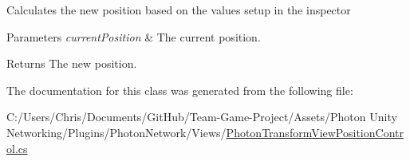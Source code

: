 Calculates the new position based on the values setup in the inspector 


\begin{DoxyParams}{Parameters}
{\em current\+Position} & The current position.\\
\hline
\end{DoxyParams}
\begin{DoxyReturn}{Returns}
The new position.
\end{DoxyReturn}


The documentation for this class was generated from the following file\+:\begin{DoxyCompactItemize}
\item 
C\+:/\+Users/\+Chris/\+Documents/\+Git\+Hub/\+Team-\/\+Game-\/\+Project/\+Assets/\+Photon Unity Networking/\+Plugins/\+Photon\+Network/\+Views/\hyperlink{_photon_transform_view_position_control_8cs}{Photon\+Transform\+View\+Position\+Control.\+cs}\end{DoxyCompactItemize}
